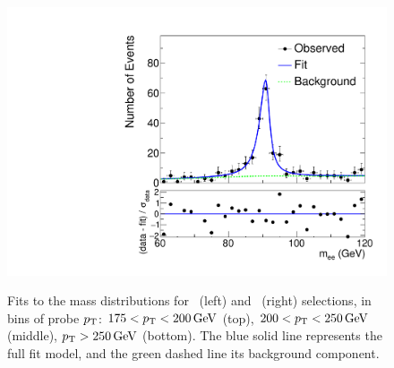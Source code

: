 \begin{figure}[htbp]
{    \includegraphics[]{Analysis/Figures/efake/fit_data_eg_pt_200_250.pdf}
  }
  \caption{
      Fits to the mass distributions for \Pe\Pe\ (left) and \Pe\Pgg\ (right) selections, in bins of probe $p_{\mathrm{T}}$: $175 < p_{\mathrm{T}} < 200\,\text{Ge\hspace{-.08em}V}$ (top), $200 < p_{\mathrm{T}} < 250\,\text{Ge\hspace{-.08em}V}$ (middle), $p_{\mathrm{T}} > 250\,\text{Ge\hspace{-.08em}V}$ (bottom). 
      The blue solid line represents the full fit model, and the green dashed line its background component.
    }
    \label{fig:efake_fits}
\end{figure}

